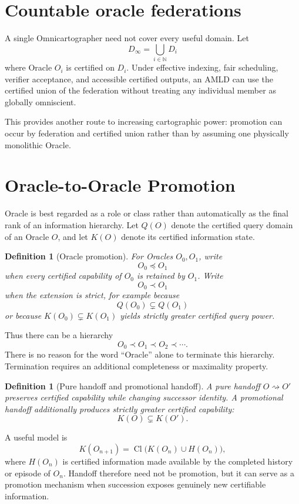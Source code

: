 \documentclass[11pt]{article}
\newtheorem{definition}[theorem]{Definition}
\newcommand{\Cl}{\operatorname{Cl}}
\newcommand{\N}{\mathbb{N}}
\begin{document}
\section{Countable oracle federations}
A single Omnicartographer need not cover every useful domain. Let
\[
D_\infty=\bigcup_{i\in\N}D_i
\]
where Oracle $O_i$ is certified on $D_i$. Under effective indexing, fair scheduling, verifier acceptance, and accessible certified outputs, an AMLD can use the certified union of the federation without treating any individual member as globally omniscient.

This provides another route to increasing cartographic power: promotion can occur by federation and certified union rather than by assuming one physically monolithic Oracle.

\section{Oracle-to-Oracle Promotion}
Oracle is best regarded as a role or class rather than automatically as the final rank of an information hierarchy. Let $Q(O)$ denote the certified query domain of an Oracle $O$, and let $K(O)$ denote its certified information state.

\begin{definition}[Oracle promotion]
For Oracles $O_0,O_1$, write
\[
O_0\preceq O_1
\]
when every certified capability of $O_0$ is retained by $O_1$. Write
\[
O_0\prec O_1
\]
when the extension is strict, for example because
\[
Q(O_0)\subsetneq Q(O_1)
\]
or because $K(O_0)\subsetneq K(O_1)$ yields strictly greater certified query power.
\end{definition}

Thus there can be a hierarchy
\[
O_0\prec O_1\prec O_2\prec\cdots.
\]
There is no reason for the word ``Oracle'' alone to terminate this hierarchy. Termination requires an additional completeness or maximality property.

\begin{definition}[Pure handoff and promotional handoff]
A pure handoff $O\rightsquigarrow O'$ preserves certified capability while changing successor identity. A promotional handoff additionally produces strictly greater certified capability:
\[
K(O)\subsetneq K(O').
\]
\end{definition}

A useful model is
\[
K(O_{n+1})=\Cl\bigl(K(O_n)\cup H(O_n)\bigr),
\]
where $H(O_n)$ is certified information made available by the completed history or episode of $O_n$. Handoff therefore need not be promotion, but it can serve as a promotion mechanism when succession exposes genuinely new certifiable information.
\end{document}
